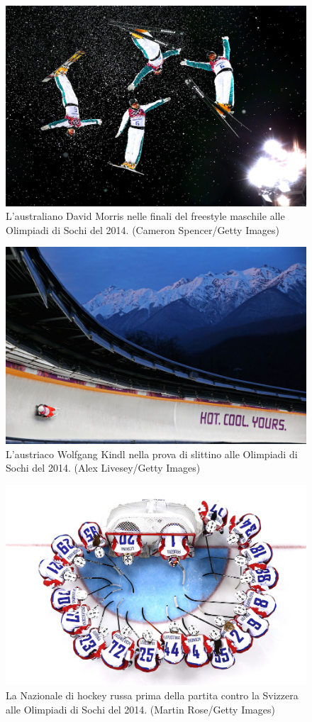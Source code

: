 \documentclass[
]{book}
\begin{document}
\begin{figure}
\includegraphics[width=0.8\linewidth]{images/IlPost/2014} \caption{L'australiano David Morris nelle finali del freestyle maschile alle Olimpiadi di Sochi del 2014. (Cameron Spencer/Getty Images)}\label{fig:unnamed-chunk-85}
\end{figure}

\begin{figure}
\includegraphics[width=0.8\linewidth]{images/IlPost/2014(2)} \caption{L'austriaco Wolfgang Kindl nella prova di slittino alle Olimpiadi di Sochi del 2014. (Alex Livesey/Getty Images)}\label{fig:unnamed-chunk-86}
\end{figure}

\begin{figure}
\includegraphics[width=0.8\linewidth]{images/IlPost/2014(3)} \caption{La Nazionale di hockey russa prima della partita contro la Svizzera alle Olimpiadi di Sochi del 2014. (Martin Rose/Getty Images)}\label{fig:unnamed-chunk-87}
\end{figure}
\end{document}
